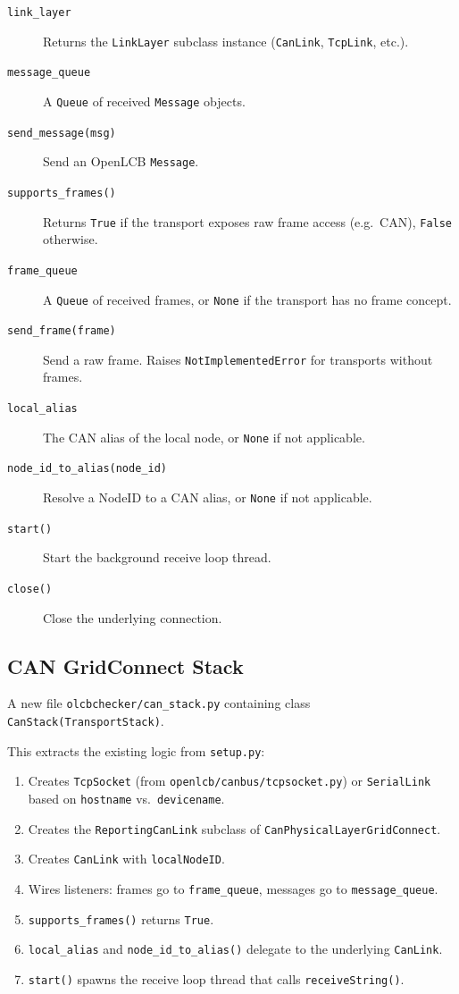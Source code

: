 \begin{description}
\item[\texttt{link\_layer}] Returns the \texttt{LinkLayer} subclass instance
    (\texttt{CanLink}, \texttt{TcpLink}, etc.).
\item[\texttt{message\_queue}] A \texttt{Queue} of received
    \texttt{Message} objects.
\item[\texttt{send\_message(msg)}] Send an OpenLCB \texttt{Message}.
\item[\texttt{supports\_frames()}] Returns \texttt{True} if the transport
    exposes raw frame access (e.g.\ CAN), \texttt{False} otherwise.
\item[\texttt{frame\_queue}] A \texttt{Queue} of received frames, or
    \texttt{None} if the transport has no frame concept.
\item[\texttt{send\_frame(frame)}] Send a raw frame.  Raises
    \texttt{NotImplementedError} for transports without frames.
\item[\texttt{local\_alias}] The CAN alias of the local node, or
    \texttt{None} if not applicable.
\item[\texttt{node\_id\_to\_alias(node\_id)}] Resolve a NodeID to a CAN
    alias, or \texttt{None} if not applicable.
\item[\texttt{start()}] Start the background receive loop thread.
\item[\texttt{close()}] Close the underlying connection.
\end{description}

\subsection{CAN GridConnect Stack}

A new file \texttt{olcbchecker/can\_stack.py} containing class
\texttt{CanStack(TransportStack)}.

This extracts the existing logic from \texttt{setup.py}:
\begin{enumerate}
\item Creates \texttt{TcpSocket} (from \texttt{openlcb/canbus/tcpsocket.py})
    or \texttt{SerialLink} based on \texttt{hostname} vs.\ \texttt{devicename}.
\item Creates the \texttt{ReportingCanLink} subclass of
    \texttt{CanPhysicalLayerGridConnect}.
\item Creates \texttt{CanLink} with \texttt{localNodeID}.
\item Wires listeners: frames go to \texttt{frame\_queue}, messages go to
    \texttt{message\_queue}.
\item \texttt{supports\_frames()} returns \texttt{True}.
\item \texttt{local\_alias} and \texttt{node\_id\_to\_alias()} delegate to the
    underlying \texttt{CanLink}.
\item \texttt{start()} spawns the receive loop thread that calls
    \texttt{receiveString()}.
\end{enumerate}

